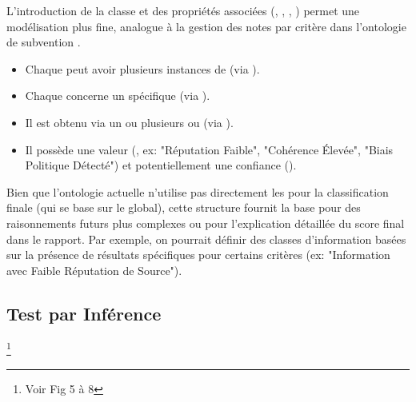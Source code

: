 \documentclass[9pt,twocolumn,twoside,french]{article}
\begin{document}
L'introduction de la classe  et des propriétés associées (, , , ) permet une modélisation plus fine, analogue à la gestion des notes par critère dans l'ontologie de subvention \parencite{Loyer2018Rapport}.
\begin{itemize}
    \item Chaque  peut avoir plusieurs instances de  (via ).
    \item Chaque  concerne un  spécifique (via ).
    \item Il est obtenu via un ou plusieurs  ou  (via ).
    \item Il possède une valeur (, ex: "Réputation Faible", "Cohérence Élevée", "Biais Politique Détecté") et potentiellement une confiance ().
\end{itemize}
Bien que l'ontologie actuelle n'utilise pas directement les  pour la classification finale (qui se base sur le  global), cette structure fournit la base pour des raisonnements futurs plus complexes ou pour l'explication détaillée du score final dans le rapport. Par exemple, on pourrait définir des classes d'information basées sur la présence de résultats spécifiques pour certains critères (ex: "Information avec Faible Réputation de Source").

\subsection{Test par Inférence} \footnote{Voir Fig 5 à 8}
\end{document}
